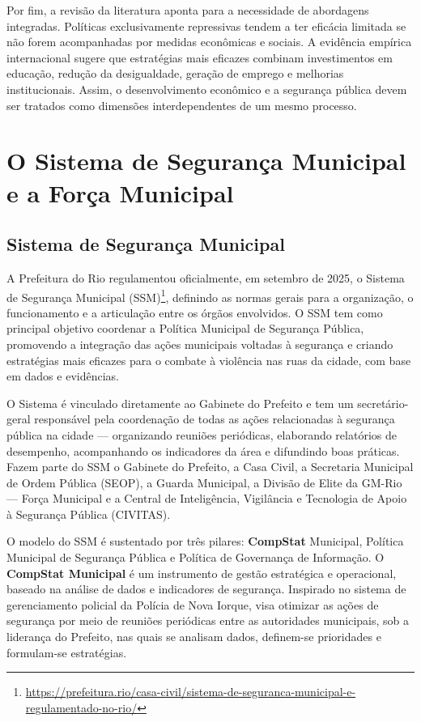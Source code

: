 \documentclass[11pt,a4paper]{article}
\begin{document}
Por fim, a revisão da literatura aponta para a necessidade de abordagens integradas. Políticas
exclusivamente repressivas tendem a ter eficácia limitada se não forem acompanhadas por medidas
econômicas e sociais. A evidência empírica internacional sugere que estratégias mais eficazes
combinam investimentos em educação, redução da desigualdade, geração de emprego e melhorias
institucionais. Assim, o desenvolvimento econômico e a segurança pública devem ser tratados como
dimensões interdependentes de um mesmo processo.

\section{O Sistema de Segurança Municipal e a Força Municipal}\label{sec:institucional}
\subsection{Sistema de Segurança Municipal}
A Prefeitura do Rio regulamentou oficialmente, em setembro de 2025, o Sistema de Segurança Municipal
(SSM)\footnote{\url{https://prefeitura.rio/casa-civil/sistema-de-seguranca-municipal-e-regulamentado-no-rio/}},
definindo as normas gerais para a organização, o funcionamento e a articulação entre os órgãos
envolvidos. O SSM tem como principal objetivo coordenar a Política Municipal de Segurança Pública,
promovendo a integração das ações municipais voltadas à segurança e criando estratégias mais
eficazes para o combate à violência nas ruas da cidade, com base em dados e evidências.

O Sistema é vinculado diretamente ao Gabinete do Prefeito e tem um secretário-geral responsável pela
coordenação de todas as ações relacionadas à segurança pública na cidade --- organizando reuniões
periódicas, elaborando relatórios de desempenho, acompanhando os indicadores da área e difundindo
boas práticas. Fazem parte do SSM o Gabinete do Prefeito, a Casa Civil, a Secretaria Municipal de
Ordem Pública (SEOP), a Guarda Municipal, a Divisão de Elite da GM-Rio --- Força Municipal e a
Central de Inteligência, Vigilância e Tecnologia de Apoio à Segurança Pública (CIVITAS).

O modelo do SSM é sustentado por três pilares: \textbf{CompStat} Municipal, Política Municipal de
Segurança Pública e Política de Governança de Informação. O \textbf{CompStat Municipal} é um
instrumento de gestão estratégica e operacional, baseado na análise de dados e indicadores de
segurança. Inspirado no sistema de gerenciamento policial da Polícia de Nova Iorque, visa otimizar
as ações de segurança por meio de reuniões periódicas entre as autoridades municipais, sob a
liderança do Prefeito, nas quais se analisam dados, definem-se prioridades e formulam-se estratégias.
\end{document}
